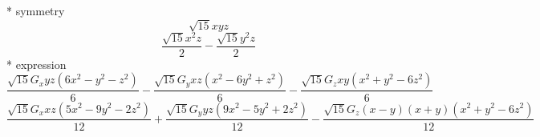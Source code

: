 \documentclass[fleqn,8pt]{jsarticle}
\begin{document}
\noindent\quad ** symmetry
\begin{dmath*}
\sqrt{15} x y z
\end{dmath*}
\begin{dmath*}
\frac{\sqrt{15} x^{2} z}{2} - \frac{\sqrt{15} y^{2} z}{2}
\end{dmath*}
\noindent\quad ** expression
\begin{dmath*}
\frac{\sqrt{15} G_{x} y z \left(6 x^{2} - y^{2} - z^{2}\right)}{6} - \frac{\sqrt{15} G_{y} x z \left(x^{2} - 6 y^{2} + z^{2}\right)}{6} - \frac{\sqrt{15} G_{z} x y \left(x^{2} + y^{2} - 6 z^{2}\right)}{6}
\end{dmath*}
\begin{dmath*}
\frac{\sqrt{15} G_{x} x z \left(5 x^{2} - 9 y^{2} - 2 z^{2}\right)}{12} + \frac{\sqrt{15} G_{y} y z \left(9 x^{2} - 5 y^{2} + 2 z^{2}\right)}{12} - \frac{\sqrt{15} G_{z} \left(x - y\right) \left(x + y\right) \left(x^{2} + y^{2} - 6 z^{2}\right)}{12}
\end{dmath*}
\end{document}
